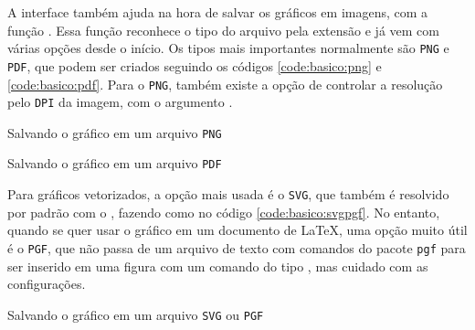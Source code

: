 A interface \pyplot também ajuda na hora de salvar os gráficos em imagens, com a função . Essa função reconhece o tipo do arquivo pela extensão e já vem com várias opções desde o início. Os tipos mais importantes normalmente são \texttt{PNG} e \texttt{PDF}, que podem ser criados seguindo os códigos \ref{code:basico:png} e  \ref{code:basico:pdf}. Para o \texttt{PNG}, também existe a opção de controlar a resolução pelo \texttt{DPI} da imagem, com o argumento .

\begin{listing}[H]
    \caption{Salvando o gráfico em um arquivo \texttt{PNG}}
    \label{code:basico:png}

\end{listing}

\begin{listing}[H]
    \caption{Salvando o gráfico em um arquivo \texttt{PDF}}
    \label{code:basico:pdf}

\end{listing}

Para gráficos vetorizados, a opção mais usada é o \texttt{SVG}, que também é resolvido por padrão com o \matplotlib, fazendo como no código \ref{code:basico:svgpgf}. No entanto, quando se quer usar o gráfico em um documento de \LaTeX, uma opção muito útil é o \texttt{PGF}, que não passa de um arquivo de texto com comandos do pacote \texttt{pgf} para ser inserido em uma figura com um comando do tipo \texttt{}, mas cuidado com as configurações.

\begin{listing}[H]
    \caption{Salvando o gráfico em um arquivo \texttt{SVG} ou \texttt{PGF}}
    \label{code:basico:svgpgf}

\end{listing}
